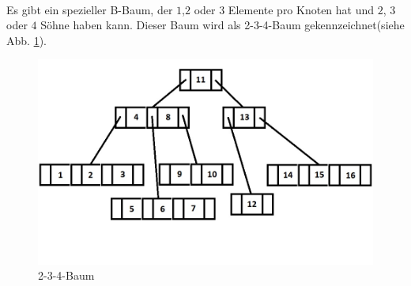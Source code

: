 \paragraph{}
Es gibt ein spezieller B-Baum, der $1$,$2$ oder $3$ Elemente pro Knoten hat und $2$, $3$ oder $4$ S\"ohne haben kann. Dieser Baum wird als 2-3-4-Baum gekennzeichnet(siehe Abb. \ref{b234}).
\begin{figure}[h!] %
	\centering
		\includegraphics[scale=0.5]{images/234baum.jpg}
	\caption{2-3-4-Baum}
	\label{b234}
\end{figure}